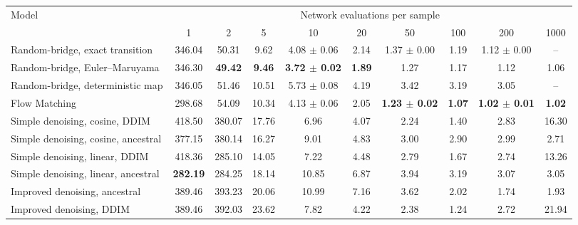 \begin{tabular}{lccccccccc}
\toprule
Model & \multicolumn{9}{c}{Network evaluations per sample} \\
\cmidrule(lr){2-10}
 & 1 & 2 & 5 & 10 & 20 & 50 & 100 & 200 & 1000 \\
\midrule
Random-bridge, exact transition & 346.04 & 50.31 & 9.62 & 4.08 $\pm$ 0.06 & 2.14 & 1.37 $\pm$ 0.00 & 1.19 & 1.12 $\pm$ 0.00 & -- \\
Random-bridge, Euler--Maruyama & 346.30 & \textbf{49.42} & \textbf{9.46} & \textbf{3.72 $\pm$ 0.02} & \textbf{1.89} & 1.27 & 1.17 & 1.12 & 1.06 \\
Random-bridge, deterministic map & 346.05 & 51.46 & 10.51 & 5.73 $\pm$ 0.08 & 4.19 & 3.42 & 3.19 & 3.05 & -- \\
Flow Matching & 298.68 & 54.09 & 10.34 & 4.13 $\pm$ 0.06 & 2.05 & \textbf{1.23 $\pm$ 0.02} & \textbf{1.07} & \textbf{1.02 $\pm$ 0.01} & \textbf{1.02} \\
Simple denoising, cosine, DDIM & 418.50 & 380.07 & 17.76 & 6.96 & 4.07 & 2.24 & 1.40 & 2.83 & 16.30 \\
Simple denoising, cosine, ancestral & 377.15 & 380.14 & 16.27 & 9.01 & 4.83 & 3.00 & 2.90 & 2.99 & 2.71 \\
Simple denoising, linear, DDIM & 418.36 & 285.10 & 14.05 & 7.22 & 4.48 & 2.79 & 1.67 & 2.74 & 13.26 \\
Simple denoising, linear, ancestral & \textbf{282.19} & 284.25 & 18.14 & 10.85 & 6.87 & 3.94 & 3.19 & 3.07 & 3.05 \\
Improved denoising, ancestral & 389.46 & 393.23 & 20.06 & 10.99 & 7.16 & 3.62 & 2.02 & 1.74 & 1.93 \\
Improved denoising, DDIM & 389.46 & 392.03 & 23.62 & 7.82 & 4.22 & 2.38 & 1.24 & 2.72 & 21.94 \\
\bottomrule
\end{tabular}
